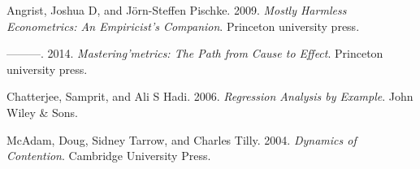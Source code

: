 \documentclass[
]{article}
\newlength{\cslhangindent}
\newlength{\cslentryspacingunit} %
\newenvironment{CSLReferences}[2] %
 {%
  \setlength{\parindent}{0pt}
  \ifodd #1
  \let\oldpar\par
  \def\par{\hangindent=\cslhangindent\oldpar}
  \fi
  \setlength{\parskip}{#2\cslentryspacingunit}
 }%
 {}
\begin{document}
\hypertarget{refs}{}
\begin{CSLReferences}{1}{0}
\leavevmode{}%
Angrist, Joshua D, and Jörn-Steffen Pischke. 2009. \emph{Mostly Harmless
Econometrics: An Empiricist's Companion}. Princeton university press.

\leavevmode{}%
---------. 2014. \emph{Mastering'metrics: The Path from Cause to
Effect}. Princeton university press.

\leavevmode{}%
Chatterjee, Samprit, and Ali S Hadi. 2006. \emph{Regression Analysis by
Example}. John Wiley \& Sons.

\leavevmode{}%
McAdam, Doug, Sidney Tarrow, and Charles Tilly. 2004. \emph{Dynamics of
Contention}. Cambridge University Press.

\end{CSLReferences}
\end{document}
